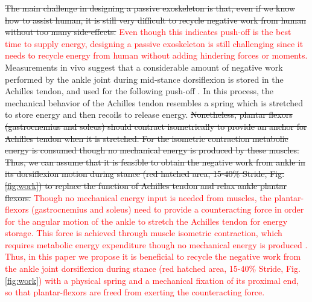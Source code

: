 \documentclass[twocolumn,cleanfoot,10pt]{asme2ej}
\begin{document}
\sout{The main challenge in designing a passive exoskeleton is that, even if we know how to assist human, it is still very difficult to recycle negative work from human without too many side-effects.}
\textcolor{red}{Even though this indicates push-off is the best time to supply energy, designing a passive exoskeleton is still challenging since it needs to recycle energy from human without adding hindering forces or moments.}
Measurements in vivo suggest that a considerable amount of negative work performed by the ankle joint during mid-stance dorsiflexion is stored in the Achilles tendon, and used for the following push-off \cite{RN16}.
In this process, the mechanical behavior of the Achilles tendon resembles a spring which is stretched to store energy and then recoils to release energy.
\sout{Nonetheless, plantar flexors (gastrocnemius and soleus) should contract isometrically to provide an anchor for Achilles tendon when it is stretched. For the isometric contraction metabolic energy is consumed though no mechanical energy is produced by these muscles\cite{RN17}. Thus, we can assume that it is feasible to obtain the negative work from ankle in its dorsiflexion motion during stance (red hatched area, 15-40\% Stride, Fig. \ref{fig:work}) to replace the function of Achilles tendon and relax ankle plantar flexors.}
\textcolor{red}{Though no mechanical energy input is needed from muscles, the plantar-flexors (gastrocnemius and soleus) need to provide a counteracting force in order for the angular motion of the ankle to stretch the Achilles tendon for energy storage.
This force is achieved through muscle isometric contraction, which requires metabolic energy expenditure though no mechanical energy is produced \cite{RN17}.
Thus, in this paper we propose it is beneficial to recycle the negative work from the ankle joint dorsiflexion during stance (red hatched area, 15-40\% Stride, Fig. \ref{fig:work}) with a physical spring and a mechanical fixation of its proximal end, so that plantar-flexors are freed from exerting the counteracting force.}
\end{document}
